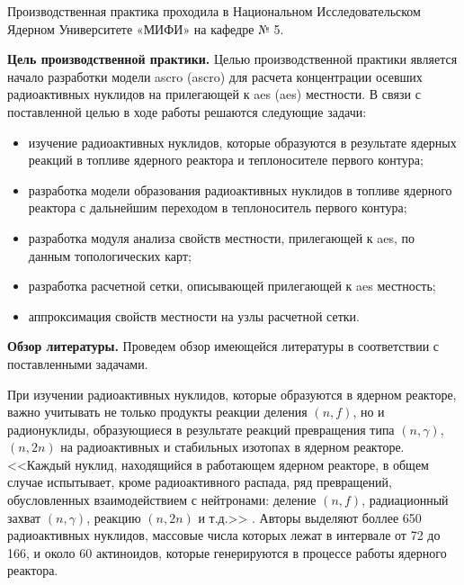 
Производственная практика проходила в Национальном Исследовательском Ядерном Университете «МИФИ» на кафедре № 5. 

\textbf{Цель производственной практики.} Целью производственной практики является начало разработки модели \ac{ascro} 
(\acl{ascro}) для расчета концентрации осевших радиоактивных нуклидов на прилегающей к \ac{aes} (\acl{aes}) местности. 
В связи с поставленной целью в ходе работы решаются следующие задачи:

\begin{itemize}
	\item изучение радиоактивных нуклидов, которые образуются в результате ядерных реакций в топливе ядерного реактора 
		и теплоносителе первого контура;
	\item разработка модели образования радиоактивных нуклидов в топливе ядерного реактора с дальнейшим переходом в
		теплоноситель первого контура;
	\item разработка модуля анализа свойств местности, прилегающей к \ac{aes}, по данным топологических карт;
	\item разработка расчетной сетки, описывающей прилегающей к \ac{aes} местность;
	\item аппроксимация свойств местности на узлы расчетной сетки.
\end{itemize}

\textbf{Обзор литературы.} Проведем обзор имеющейся литературы в соответствии с поставленными задачами.

При изучении радиоактивных нуклидов, которые образуются в ядерном реакторе, важно учитывать не только продукты реакции 
деления $(n, f)$, но и радионуклиды, образующиеся в результате реакций превращения типа $(n, \gamma)$, $(n, 2n)$ на 
радиоактивных и стабильных изотопах в ядерном реакторе. <<Каждый нуклид, находящийся в работающем ядерном реакторе, в 
общем случае испытывает, кроме радиоактивного распада, ряд превращений, обусловленных взаимодействием с нейтронами: 
деление $(n, f)$, радиационный захват $(n, \gamma)$, реакцию $(n, 2n)$ и т.д.>> \citep[с.~6]{kolobashkin}.  
Авторы \cite{kolobashkin} выделяют боллее 650 радиоактивных нуклидов, массовые числа которых лежат в интервале от 72 до 
166, и около 60 актиноидов, которые генерируются в процессе работы ядерного реактора.

